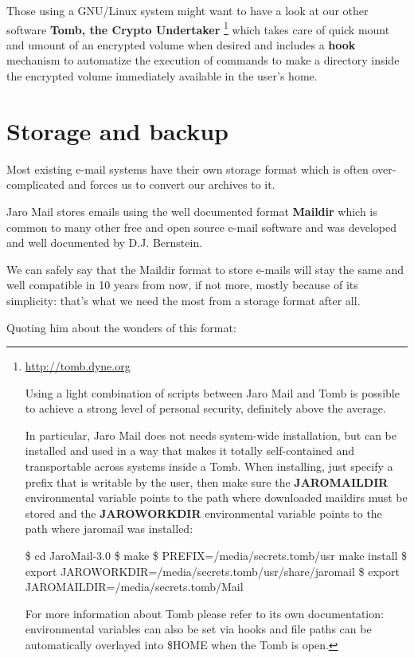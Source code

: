 \documentclass[a4,onecolumn,portrait]{article}
\begin{document}
Those using a GNU/Linux system might want to have a look at our other software \textbf{Tomb, the Crypto Undertaker} \footnote{\url{http://tomb.dyne.org}

Using a light combination of scripts between Jaro Mail and Tomb is possible to achieve a strong level of personal security, definitely above the average.

In particular, Jaro Mail does not needs system-wide installation, but can be installed and used in a way that makes it totally self-contained and transportable across systems inside a Tomb. When installing, just specify a prefix that is writable by the user, then make sure the \textbf{JAROMAILDIR} environmental variable points to the path where downloaded maildirs must be stored and the \textbf{JAROWORKDIR} environmental variable points to the path where jaromail was installed:

\$ cd JaroMail-3.0
\$ make
\$ PREFIX=/media/secrets.tomb/usr make install
\$ export JAROWORKDIR=/media/secrets.tomb/usr/share/jaromail
\$ export JAROMAILDIR=/media/secrets.tomb/Mail

For more information about Tomb please refer to its own documentation: environmental variables can also be set via hooks and file paths can be automatically overlayed into \$HOME when the Tomb is open.} which takes care of quick mount and umount of an encrypted volume when desired and includes a \textbf{hook} mechanism to automatize the execution of commands to make a directory inside the encrypted volume immediately available in the user's home.

\section{Storage and backup}
\label{sec-10}

Most existing e-mail systems have their own storage format which is
often over-complicated and forces us to convert our archives to it.

Jaro Mail stores emails using the well documented format \textbf{Maildir}
which is common to many other free and open source e-mail software and
was developed and well documented by D.J. Bernstein.

We can safely say that the Maildir format to store e-mails will stay
the same and well compatible in 10 years from now, if not more, mostly
because of its simplicity: that's what we need the most from a storage
format after all.

Quoting him about the wonders of this format:
\end{document}

